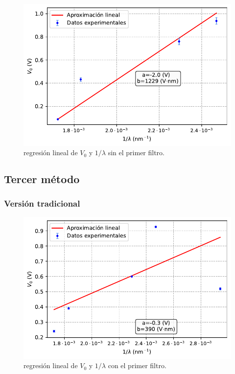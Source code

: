\documentclass[12pt,a4paper]{article}
\numberwithin{equation}{section}
\numberwithin{table}{section}
\numberwithin{figure}{section}
\begin{document}
\begin{figure}[h!]  \centering
\includegraphics[scale=0.97]{Metodo_2-sin.pdf}
\caption{regresión lineal de $V_0$ y $1/\lambda$ sin el primer filtro.}
\label{Fig:6.4.2}
\end{figure}
\newpage

\subsection{Tercer método}

\subsubsection{Versión tradicional}

\begin{figure}[h!]  \centering
\includegraphics[scale=0.97]{Metodo_3-Clasico-con.pdf}
\caption{regresión lineal de $V_0$ y $1/\lambda$ con el primer filtro.}
\label{Fig:6.5.1}
\end{figure}
\end{document}
